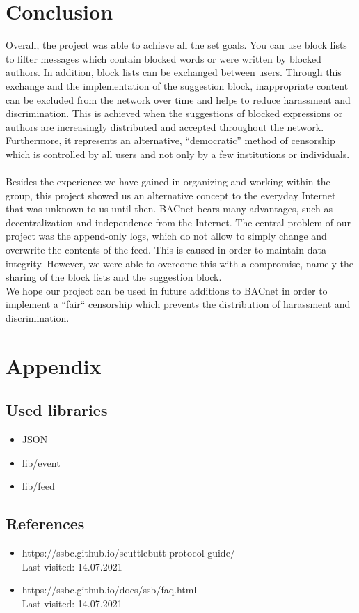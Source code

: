 \documentclass[12pt]{article}
\begin{document}
\newpage
\section{Conclusion}
Overall, the project was able to achieve all the set goals. You can use block lists to filter messages which contain blocked words or were written by blocked authors. In addition, block lists can be exchanged between users. Through this exchange and the implementation of the suggestion block, inappropriate content can be excluded from the network over time and helps to reduce harassment and discrimination. This is achieved when the suggestions of blocked expressions or authors are increasingly distributed and accepted throughout the network. Furthermore, it represents an alternative, “democratic” method of censorship which is controlled by all users and not only by a few institutions or individuals.\\
\\
Besides the experience we have gained in organizing and working within the group, this project showed us an alternative concept to the everyday Internet that was unknown to us until then. BACnet bears many advantages, such as decentralization and independence from the Internet. 
The central problem of our project was the append-only logs, which do not allow to simply change and overwrite the contents of the feed. This is caused in order to maintain data integrity. 
However, we were able to overcome this with a compromise, namely the sharing of the block lists and the suggestion block.\\
We hope our project can be used in future additions to BACnet in order to implement a “fair“ censorship which prevents the distribution of harassment and discrimination.



\section{Appendix}
\subsection{Used libraries}
\begin{itemize}
	\item JSON
	\item lib/event
	\item lib/feed
\end{itemize}

\subsection{References}
\begin{itemize}
  	\item https://ssbc.github.io/scuttlebutt-protocol-guide/ \\
		  	Last visited: 14.07.2021
	\item https://ssbc.github.io/docs/ssb/faq.html \\
 			Last visited: 14.07.2021
\end{itemize}
\end{document}
